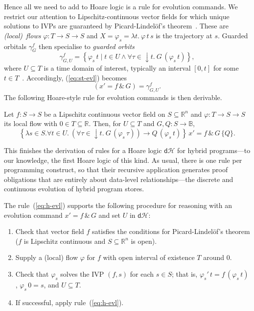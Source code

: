 \documentclass[envcountsame,envcountsect]{llncs}
\newcommand{\dH}{\mathsf{d}\mathcal{H}}
\newcommand{\flow}{\varphi}
\newcommand{\reals}{\mathbb{R}}
\newcommand{\bools}{\mathbb{B}}
\begin{document}
Hence all we need to add to Hoare logic is a rule for evolution
commands.  We restrict our attention to Lipschitz-continuous vector
fields for which unique solutions to IVPs are guaranteed by
Picard-Lindel\"of's theorem~\cite{Teschl12}.  These are \emph{(local)\
  flows} $\flow:T\to S\to S$ and $X=\flow_s=\lambda t.\ \flow\, t\, s$
is the trajectory at $s$. Guarded orbitals $\gamma^f_G$ then
specialise to \emph{guarded orbits}
\begin{equation*}
  \gamma^f_{G,U} = \left\{\flow_s\, t\mid t\in U\land \forall\tau \in
  {\downarrow}t.\ G\, (\flow_s\, t)\right\},
\end{equation*}
where $U\subseteq T$ is a time domain of interest, typically an
interval $[0,t]$ for some $t\in T$~\cite{MuniveS19}.  Accordingly,
(\ref{eq:st-evl}) becomes
\begin{equation}
  \left(x' = f\, \&\, G\right)= \gamma^f_{G,U}.\label{eq:st-evl-flow}\tag{st-evl-flow}
\end{equation}
The following Hoare-style rule for evolution commands is then
derivable.
\begin{lemma}\label{P:h-evl-lemma}
  Let $f:S\to S$ be a Lipschitz continuous vector field on
  $S\subseteq \reals^n$ and $\flow:T\to S\to S$ its local flow with
  $0\in T\subseteq \reals$. Then, for $U\subseteq T$ and
  $G,Q:S\to\bools$,
\begin{equation}
\left\{\lambda s\in S.\forall t\in U.\ \left(\forall
\tau\in {\downarrow}t.\ G\, (\flow_s\, \tau)\right) \rightarrow Q\,
(\flow_s\, t)\right\}\, x' = f\, \&\, G\, \{Q\}. \label{eq:h-evl}\tag{h-evl}
\end{equation}
\end{lemma}

This finishes the derivation of rules for a Hoare logic $\dH$ for
hybrid programs---to our knowledge, the first Hoare logic of this
kind. As usual, there is one rule per programming construct, so that
their recursive application generates proof obligations that are
entirely about data-level relationships---the discrete and continuous
evolution of hybrid program stores.

The rule~(\ref{eq:h-evl}) supports the following procedure
for reasoning with an evolution command $x' = f\, \&\, G$ and set $U$
in $\dH$:
\begin{enumerate}
\item Check that vector field $f$ satisfies the conditions for
  Picard-Lindel\"of's theorem ($f$ is Lipschitz continuous and
  $S\subseteq\reals^n$ is open).
\item Supply a (local) flow $\flow$ for $f$ with open interval of
  existence $T$ around $0$.
\item Check that $\flow_s$ solves the IVP $(f,s)$ for each $s\in S$;
  that is, $\flow_s'\, t = f\, (\flow_s\, t)$, $\flow_s\, 0 = s$, and
  $U\subseteq T$.
\item If successful, apply rule~(\ref{eq:h-evl}).
\end{enumerate}
\end{document}
